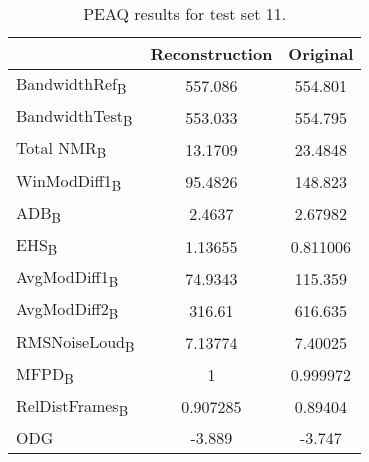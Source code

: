 \begin{table}\begin{center} %
\caption{PEAQ results for test set 11.}
\label{tab:PEAQdata4}
\begin{tabular}{|l|c|c|}
  \hline
                                    & Reconstruction & Original \\ \hline
  BandwidthRef\textsubscript{B}     & 557.086        & 554.801 \\
  BandwidthTest\textsubscript{B}    & 553.033        & 554.795 \\
  Total NMR\textsubscript{B}        & 13.1709        & 23.4848 \\
  WinModDiff1\textsubscript{B}      & 95.4826        & 148.823 \\
  ADB\textsubscript{B}              & 2.4637         & 2.67982 \\
  EHS\textsubscript{B}              & 1.13655        & 0.811006\\
  AvgModDiff1\textsubscript{B}      & 74.9343        & 115.359 \\
  AvgModDiff2\textsubscript{B}      & 316.61         & 616.635 \\
  RMSNoiseLoud\textsubscript{B}     & 7.13774        & 7.40025 \\
  MFPD\textsubscript{B}             & 1              & 0.999972\\
  RelDistFrames\textsubscript{B}    & 0.907285       & 0.89404 \\
  ODG                               & -3.889      & -3.747\\
  \hline
\end{tabular}
\end{center}\end{table}

